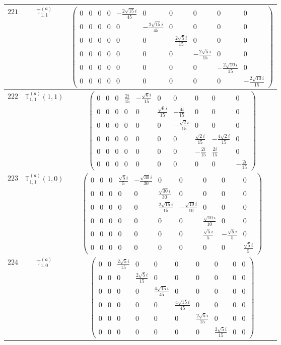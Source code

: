 \documentclass[fleqn,8pt,landscape]{jsarticle}
\begin{document}
\begin{center}
\begin{longtable}{ccc}
$ 221 $ & $ \mathbb{T}_{1,1}^{(a)} $ & $ \begin{pmatrix} 0 & 0 & 0 & 0 & - \frac{2 \sqrt{15} i}{45} & 0 & 0 & 0 & 0 & 0 \\ 0 & 0 & 0 & 0 & 0 & - \frac{2 \sqrt{15} i}{45} & 0 & 0 & 0 & 0 \\ 0 & 0 & 0 & 0 & 0 & 0 & - \frac{2 \sqrt{5} i}{15} & 0 & 0 & 0 \\ 0 & 0 & 0 & 0 & 0 & 0 & 0 & - \frac{2 \sqrt{5} i}{15} & 0 & 0 \\ 0 & 0 & 0 & 0 & 0 & 0 & 0 & 0 & - \frac{2 \sqrt{10} i}{15} & 0 \\ 0 & 0 & 0 & 0 & 0 & 0 & 0 & 0 & 0 & - \frac{2 \sqrt{10} i}{15} \end{pmatrix} $ \\ \hline
$ 222 $ & $ \mathbb{T}_{1,1}^{(a)}(1,1) $ & $ \begin{pmatrix} 0 & 0 & 0 & \frac{2 i}{15} & - \frac{\sqrt{6} i}{15} & 0 & 0 & 0 & 0 & 0 \\ 0 & 0 & 0 & 0 & 0 & \frac{\sqrt{6} i}{15} & - \frac{4 i}{15} & 0 & 0 & 0 \\ 0 & 0 & 0 & 0 & 0 & 0 & - \frac{\sqrt{2} i}{15} & 0 & 0 & 0 \\ 0 & 0 & 0 & 0 & 0 & 0 & 0 & \frac{\sqrt{2} i}{15} & - \frac{4 \sqrt{2} i}{15} & 0 \\ 0 & 0 & 0 & 0 & 0 & 0 & 0 & - \frac{2 i}{15} & \frac{2 i}{15} & 0 \\ 0 & 0 & 0 & 0 & 0 & 0 & 0 & 0 & 0 & - \frac{2 i}{15} \end{pmatrix} $ \\ \hline
$ 223 $ & $ \mathbb{T}_{1,1}^{(a)}(1,0) $ & $ \begin{pmatrix} 0 & 0 & 0 & \frac{\sqrt{5} i}{5} & - \frac{\sqrt{30} i}{30} & 0 & 0 & 0 & 0 & 0 \\ 0 & 0 & 0 & 0 & 0 & \frac{\sqrt{30} i}{30} & 0 & 0 & 0 & 0 \\ 0 & 0 & 0 & 0 & 0 & \frac{2 \sqrt{15} i}{15} & - \frac{\sqrt{10} i}{10} & 0 & 0 & 0 \\ 0 & 0 & 0 & 0 & 0 & 0 & 0 & \frac{\sqrt{10} i}{10} & 0 & 0 \\ 0 & 0 & 0 & 0 & 0 & 0 & 0 & \frac{\sqrt{5} i}{5} & - \frac{\sqrt{5} i}{5} & 0 \\ 0 & 0 & 0 & 0 & 0 & 0 & 0 & 0 & 0 & \frac{\sqrt{5} i}{5} \end{pmatrix} $ \\ \hline
$ 224 $ & $ \mathbb{T}_{1,0}^{(a)} $ & $ \begin{pmatrix} 0 & 0 & \frac{2 \sqrt{5} i}{15} & 0 & 0 & 0 & 0 & 0 & 0 & 0 \\ 0 & 0 & 0 & \frac{2 \sqrt{5} i}{15} & 0 & 0 & 0 & 0 & 0 & 0 \\ 0 & 0 & 0 & 0 & \frac{4 \sqrt{15} i}{45} & 0 & 0 & 0 & 0 & 0 \\ 0 & 0 & 0 & 0 & 0 & \frac{4 \sqrt{15} i}{45} & 0 & 0 & 0 & 0 \\ 0 & 0 & 0 & 0 & 0 & 0 & \frac{2 \sqrt{5} i}{15} & 0 & 0 & 0 \\ 0 & 0 & 0 & 0 & 0 & 0 & 0 & \frac{2 \sqrt{5} i}{15} & 0 & 0 \end{pmatrix} $ \\ \hline

\end{longtable}
\end{center}
\end{document}
